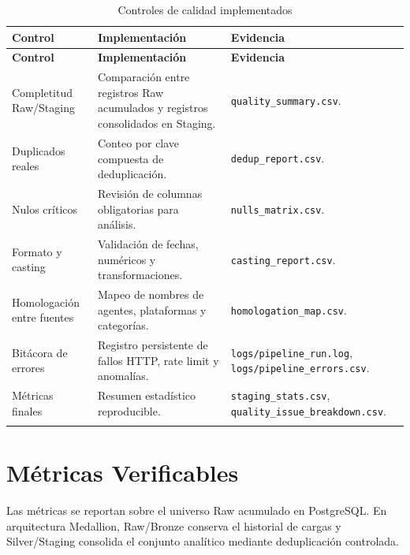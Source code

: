 \documentclass[12pt,a4paper]{article}
\newcommand{\pathcode}[1]{\begingroup\footnotesize\ttfamily\nolinkurl{#1}\endgroup}
\begin{document}
\scriptsize
\begin{longtable}{|P{3.7cm}|P{4.8cm}|P{4.8cm}|}
\hline
{}
\textbf{Control} & \textbf{Implementaci\'on} & \textbf{Evidencia} \\ \hline
\endfirsthead
\hline
{}
\textbf{Control} & \textbf{Implementaci\'on} & \textbf{Evidencia} \\ \hline
\endhead
Completitud Raw/Staging & Comparaci\'on entre registros Raw acumulados y registros consolidados en Staging. & \pathcode{quality_summary.csv}. \\ \hline
Duplicados reales & Conteo por clave compuesta de deduplicaci\'on. & \pathcode{dedup_report.csv}. \\ \hline
Nulos cr\'iticos & Revisi\'on de columnas obligatorias para an\'alisis. & \pathcode{nulls_matrix.csv}. \\ \hline
Formato y casting & Validaci\'on de fechas, num\'ericos y transformaciones. & \pathcode{casting_report.csv}. \\ \hline
Homologaci\'on entre fuentes & Mapeo de nombres de agentes, plataformas y categor\'ias. & \pathcode{homologation_map.csv}. \\ \hline
Bit\'acora de errores & Registro persistente de fallos HTTP, rate limit y anomal\'ias. & \pathcode{logs/pipeline_run.log}, \pathcode{logs/pipeline_errors.csv}. \\ \hline
M\'etricas finales & Resumen estad\'istico reproducible. & \pathcode{staging_stats.csv}, \pathcode{quality_issue_breakdown.csv}. \\ \hline
\caption{Controles de calidad implementados}
\end{longtable}
\normalsize

\section{M\'etricas Verificables}

Las m\'etricas se reportan sobre el universo Raw acumulado en PostgreSQL. En arquitectura Medallion, Raw/Bronze conserva el historial de cargas y Silver/Staging consolida el conjunto anal\'itico mediante deduplicaci\'on controlada.
\end{document}
